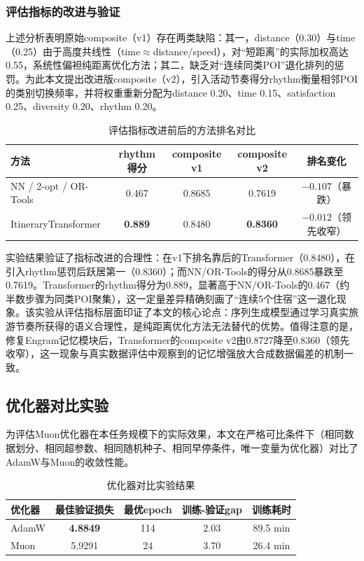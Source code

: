 \documentclass[12pt,a4paper]{ctexart}
\newenvironment{tighttable}
  {\setstretch{1.0}\small}
  {}
\begin{document}
\subsubsection{评估指标的改进与验证}

上述分析表明原始composite（v1）存在两类缺陷：其一，distance（0.30）与time（0.25）由于高度共线性（time$\approx$distance/speed），对“短距离”的实际加权高达0.55，系统性偏袒纯距离优化方法；其二，缺乏对“连续同类POI”退化排列的惩罚。为此本文提出改进版composite（v2），引入活动节奏得分rhythm衡量相邻POI的类别切换频率，并将权重重新分配为distance 0.20、time 0.15、satisfaction 0.25、diversity 0.20、rhythm 0.20。

\begin{table}[H]
\centering
\caption{评估指标改进前后的方法排名对比}
\label{tab:composite_v2}
\begin{tighttable}
\begin{tabular}{lcccc}
\toprule
方法 & rhythm得分 & composite v1 & composite v2 & 排名变化 \\
\midrule
NN / 2-opt / OR-Tools & 0.467 & 0.8685 & 0.7619 & $-0.107$（暴跌） \\
ItineraryTransformer & \textbf{0.889} & 0.8480 & \textbf{0.8360} & $-0.012$（领先收窄） \\
\bottomrule
\end{tabular}
\end{tighttable}
\end{table}

实验结果验证了指标改进的合理性：在v1下排名靠后的Transformer（0.8480），在引入rhythm惩罚后跃居第一（0.8360）；而NN/OR-Tools的得分从0.8685暴跌至0.7619。Transformer的rhythm得分为0.889，显著高于NN/OR-Tools的0.467（约半数步骤为同类POI聚集），这一定量差异精确刻画了“连续5个住宿”这一退化现象。该实验从评估指标层面印证了本文的核心论点：序列生成模型通过学习真实旅游节奏所获得的语义合理性，是纯距离优化方法无法替代的优势。值得注意的是，修复Engram记忆模块后，Transformer的composite v2由0.8727降至0.8360（领先收窄），这一现象与真实数据评估中观察到的记忆增强放大合成数据偏差的机制一致。

\subsection{优化器对比实验}
\label{sec:optimizer}

为评估Muon优化器在本任务规模下的实际效果，本文在严格可比条件下（相同数据划分、相同超参数、相同随机种子、相同早停条件，唯一变量为优化器）对比了AdamW与Muon的收敛性能。

\begin{table}[H]
\centering
\caption{优化器对比实验结果}
\label{tab:optimizer_comparison}
\begin{tighttable}
\begin{tabular}{lcccc}
\toprule
优化器 & 最佳验证损失 & 最优epoch & 训练-验证gap & 训练耗时 \\
\midrule
AdamW & \textbf{4.8849} & 114 & 2.03 & 89.5 min \\
Muon & 5.9291 & 24 & 3.70 & 26.4 min \\
\bottomrule
\end{tabular}
\end{tighttable}
\end{table}
\end{document}
